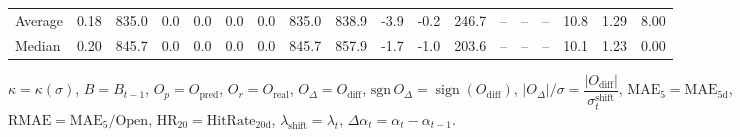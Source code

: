 \begin{threeparttable}
{\begin{tabular}{lrrrrrrrrrrrrrrrrr}
Average &     0.18 & 835.0 &               0.0 &               0.0 &                0.0 &                0.0 & 835.0 & 838.9 &       -3.9 &                     -0.2 &               246.7 &         -- &        -- &             -- &             10.8 &            1.29 &                   8.00 \\
 Median &     0.20 & 845.7 &               0.0 &               0.0 &                0.0 &                0.0 & 845.7 & 857.9 &       -1.7 &                     -1.0 &               203.6 &         -- &        -- &             -- &             10.1 &            1.23 &                   0.00 \\
\bottomrule
\end{tabular}
}
\begin{tablenotes}\footnotesize
\item $\kappa=\kappa(\sigma)$, $B=B_{t-1}$, $O_p=O_{\text{pred}}$, $O_r=O_{\text{real}}$, $O_\Delta=O_{\text{diff}}$, $\mathrm{sgn}\,O_\Delta=\operatorname{sign}(O_{\text{diff}})$, $|O_\Delta|/\sigma=\dfrac{|O_{\text{diff}}|}{\sigma_t^{\text{shift}}}$, $\mathrm{MAE}_5=\mathrm{MAE}_{5\text{d}}$, $\mathrm{RMAE}= \mathrm{MAE}_5 / \text{Open}$, $\mathrm{HR}_{20}=\mathrm{HitRate}_{20\text{d}}$, 
$\lambda_{\text{shift}}=\lambda_t$, 
$\Delta\alpha_t=\alpha_t-\alpha_{t-1}$.
\end{tablenotes}
\end{threeparttable}
\endgroup

